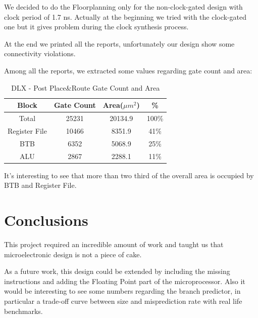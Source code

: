 \documentclass[12pt]{article}
\begin{document}
We decided to do the Floorplanning only for the non-clock-gated design with clock period of 1.7 ns.
Actually at the beginning we tried with the clock-gated one but it gives problem during the clock synthesis process.

At the end we printed all the reports, unfortunately our design show some connectivity violations.

Among all the reports, we extracted some values regarding gate count and area:
\begin{table}
\begin{center}
	\begin{tabular}{ | c | c | c | c |}
		\hline
		\rowcolor{LimeGreen}   Block & Gate Count & Area($\mu m^2$)& \%\\ \hline
		Total & 25231 & 20134.9 & 100\% \\ \hline
		Register File & 10466 & 8351.9 & 41\% \\ \hline
		BTB & 6352 &  5068.9 & 25\% \\ \hline
		ALU & 2867 & 2288.1 & 11\% \\ \hline
	\end{tabular}
	\caption{DLX - Post Place\&Route Gate Count and Area}
	\label{AREA}
\end{center}
\end{table}
It's interesting to see that more than two third of the overall area is occupied by BTB and Register File.



\section{Conclusions}\label{Conclusions}
This project required an incredible amount of work and taught us that microelectronic design is not a piece of cake.

As a future work, this design could be extended by including the missing instructions and adding the Floating Point part of the microprocessor. 
Also it would be interesting to see some numbers regarding the branch predictor, in particular a trade-off curve between size and misprediction rate with real life benchmarks.


\printbibliography
\end{document}

